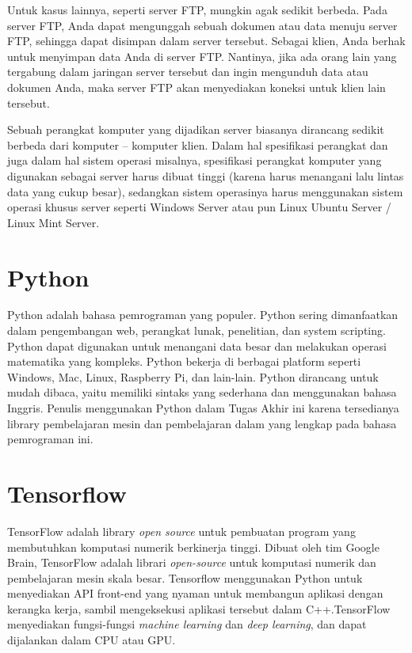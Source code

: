 \par Untuk kasus lainnya, seperti server FTP, mungkin agak sedikit berbeda. Pada server FTP, Anda dapat mengunggah sebuah dokumen atau data menuju server FTP, sehingga dapat disimpan dalam server tersebut. Sebagai klien, Anda berhak untuk menyimpan data Anda di server FTP. Nantinya, jika ada orang lain yang tergabung dalam jaringan server tersebut dan ingin mengunduh data atau dokumen Anda, maka server FTP akan menyediakan koneksi untuk klien lain tersebut.

\par Sebuah perangkat komputer yang dijadikan server biasanya dirancang sedikit berbeda dari komputer – komputer klien. Dalam hal spesifikasi perangkat dan juga dalam hal sistem operasi misalnya, spesifikasi perangkat komputer yang digunakan sebagai server harus dibuat tinggi (karena harus menangani lalu lintas data yang cukup besar), sedangkan sistem operasinya harus menggunakan sistem operasi khusus server seperti Windows Server atau pun Linux Ubuntu Server / Linux Mint Server\cite{server_def}.

\section{Python}
\par Python adalah bahasa pemrograman yang populer. Python sering dimanfaatkan dalam pengembangan web, perangkat lunak, penelitian, dan system scripting. Python dapat digunakan untuk menangani data besar dan melakukan operasi matematika yang kompleks. Python bekerja di berbagai platform seperti Windows, Mac, Linux, Raspberry Pi, dan lain-lain. Python dirancang untuk mudah dibaca, yaitu memiliki sintaks yang sederhana dan
menggunakan bahasa Inggris\cite{python_def}.
Penulis menggunakan Python dalam Tugas Akhir ini karena tersedianya library pembelajaran mesin dan pembelajaran dalam yang lengkap pada bahasa pemrograman ini.


\section{Tensorflow}
\par TensorFlow adalah library \textit{open source} untuk pembuatan program yang membutuhkan komputasi numerik berkinerja tinggi. Dibuat oleh tim Google Brain, TensorFlow adalah librari \textit{open-source} untuk komputasi numerik dan pembelajaran mesin skala besar. Tensorflow menggunakan Python untuk menyediakan API front-end yang nyaman untuk membangun aplikasi dengan kerangka kerja, sambil mengeksekusi aplikasi tersebut dalam C++.TensorFlow menyediakan fungsi-fungsi \textit{machine learning} dan \textit{deep learning}, dan dapat dijalankan dalam CPU atau GPU\cite{tensorflow_def}.

